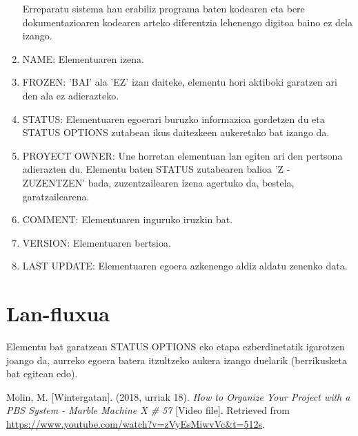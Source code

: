 \documentclass[10pt,a4paper]{article}
\let\nf\normalfont %
\newcommand{\cf}{\normalfont\sffamily}
\begin{document}
\begin{enumerate}
Erreparatu sistema hau erabiliz programa baten kodearen eta bere dokumentazioaren kodearen arteko diferentzia lehenengo digitoa baino ez dela izango.
\\ 

\item \cf NAME: \nf Elementuaren izena.
\\

\item \cf FROZEN: \nf 'BAI' ala 'EZ' izan daiteke, elementu hori aktiboki garatzen ari den ala ez adierazteko.
\\

\item \cf STATUS: \nf Elementuaren egoerari buruzko informazioa gordetzen du eta \cf STATUS OPTIONS \nf zutabean ikus daitezkeen aukeretako bat izango da.
\\

\item \cf PROYECT OWNER: \nf Une horretan elementuan lan egiten ari den pertsona adierazten du. Elementu baten \cf STATUS \nf zutabearen balioa \cf 'Z - ZUZENTZEN' \nf bada, zuzentzailearen izena agertuko da, bestela, garatzailearena.
\\

\item \cf COMMENT: \nf Elementuaren inguruko iruzkin bat.
\\

\item \cf VERSION: \nf Elementuaren bertsioa.
\\

\item \cf LAST UPDATE: \nf Elementuaren egoera azkenengo aldiz aldatu zenenko data.
\\
\end{enumerate} 

\section{Lan-fluxua}

Elementu bat garatzean \cf STATUS OPTIONS \nf eko etapa ezberdinetatik igarotzen joango da, aurreko egoera batera itzultzeko aukera izango duelarik (berrikusketa bat egitean edo).
 
\begin{thebibliography}{1}
 Molin, M. [Wintergatan]. (2018, urriak 18). \textit{How to Organize Your Project with a PBS System - Marble Machine X \# 57} [Video file]. Retrieved from \url{https://www.youtube.com/watch?v=zVyEsMiwvVc&t=512s}.
\end{thebibliography}
\end{document}
